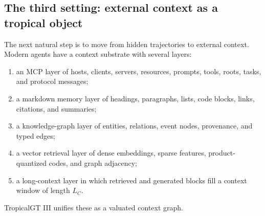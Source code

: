 \documentclass[11pt]{article}
\theoremstyle{definition}
\theoremstyle{remark}
\newcommand{\LC}{L_C}
\begin{document}
\subsection{The third setting: external context as a tropical object}

The next natural step is to move from hidden trajectories to external context. Modern agents have a context substrate with several layers:
\begin{enumerate}
    \item an MCP layer of hosts, clients, servers, resources, prompts, tools, roots, tasks, and protocol messages;
    \item a markdown memory layer of headings, paragraphs, lists, code blocks, links, citations, and summaries;
    \item a knowledge-graph layer of entities, relations, event nodes, provenance, and typed edges;
    \item a vector retrieval layer of dense embeddings, sparse features, product-quantized codes, and graph adjacency;
    \item a long-context layer in which retrieved and generated blocks fill a context window of length \(\LC\).
\end{enumerate}
TropicalGT III unifies these as a valuated context graph.
\end{document}
